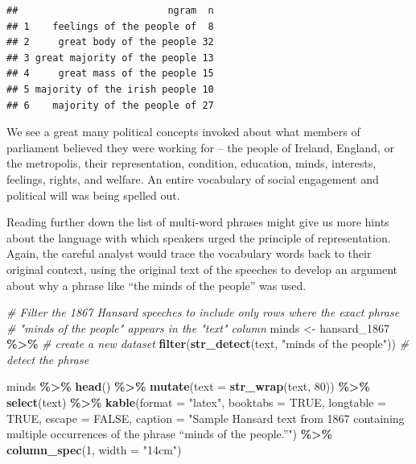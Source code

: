 \documentclass[
]{article}
\newenvironment{Shaded}{\begin{snugshade}}{\end{snugshade}}
\newcommand{\AttributeTok}[1]{\textcolor[rgb]{0.13,0.29,0.53}{#1}}
\newcommand{\CommentTok}[1]{\textcolor[rgb]{0.56,0.35,0.01}{\textit{#1}}}
\newcommand{\ConstantTok}[1]{\textcolor[rgb]{0.56,0.35,0.01}{#1}}
\newcommand{\DecValTok}[1]{\textcolor[rgb]{0.00,0.00,0.81}{#1}}
\newcommand{\FunctionTok}[1]{\textcolor[rgb]{0.13,0.29,0.53}{\textbf{#1}}}
\newcommand{\NormalTok}[1]{#1}
\newcommand{\OtherTok}[1]{\textcolor[rgb]{0.56,0.35,0.01}{#1}}
\newcommand{\SpecialCharTok}[1]{\textcolor[rgb]{0.81,0.36,0.00}{\textbf{#1}}}
\newcommand{\StringTok}[1]{\textcolor[rgb]{0.31,0.60,0.02}{#1}}
\begin{document}
\begin{verbatim}
##                          ngram  n
## 1    feelings of the people of  8
## 2     great body of the people 32
## 3 great majority of the people 13
## 4     great mass of the people 15
## 5 majority of the irish people 10
## 6    majority of the people of 27
\end{verbatim}

We see a great many political concepts invoked about what members of
parliament believed they were working for -- the people of Ireland,
England, or the metropolis, their representation, condition, education,
minds, interests, feelings, rights, and welfare. An entire vocabulary of
social engagement and political will was being spelled out.

Reading further down the list of multi-word phrases might give us more
hints about the language with which speakers urged the principle of
representation. Again, the careful analyst would trace the vocabulary
words back to their original context, using the original text of the
speeches to develop an argument about why a phrase like ``the minds of
the people'' was used.

\begin{Shaded}
\begin{Highlighting}[]
\CommentTok{\# Filter the 1867 Hansard speeches to include only rows where the exact phrase }
\CommentTok{\# "minds of the people" appears in the "text" column}
\NormalTok{minds }\OtherTok{\textless{}{-}}\NormalTok{ hansard\_1867 }\SpecialCharTok{\%\textgreater{}\%} \CommentTok{\# create a new dataset}
  \FunctionTok{filter}\NormalTok{(}\FunctionTok{str\_detect}\NormalTok{(text, }\StringTok{"minds of the people"}\NormalTok{)) }\CommentTok{\# detect the phrase}

\NormalTok{minds }\SpecialCharTok{\%\textgreater{}\%}
  \FunctionTok{head}\NormalTok{() }\SpecialCharTok{\%\textgreater{}\%}
  \FunctionTok{mutate}\NormalTok{(}\AttributeTok{text =} \FunctionTok{str\_wrap}\NormalTok{(text, }\DecValTok{80}\NormalTok{)) }\SpecialCharTok{\%\textgreater{}\%}
  \FunctionTok{select}\NormalTok{(text) }\SpecialCharTok{\%\textgreater{}\%}
  \FunctionTok{kable}\NormalTok{(}\AttributeTok{format =} \StringTok{"latex"}\NormalTok{, }
        \AttributeTok{booktabs =} \ConstantTok{TRUE}\NormalTok{, }
        \AttributeTok{longtable =} \ConstantTok{TRUE}\NormalTok{, }
        \AttributeTok{escape =} \ConstantTok{FALSE}\NormalTok{,}
        \AttributeTok{caption =} \StringTok{"Sample Hansard text from 1867 containing multiple }
\StringTok{        occurrences of the phrase “minds of the people.”"}\NormalTok{) }\SpecialCharTok{\%\textgreater{}\%}
  \FunctionTok{column\_spec}\NormalTok{(}\DecValTok{1}\NormalTok{, }\AttributeTok{width =} \StringTok{"14cm"}\NormalTok{)}
\end{Highlighting}
\end{Shaded}
\end{document}
